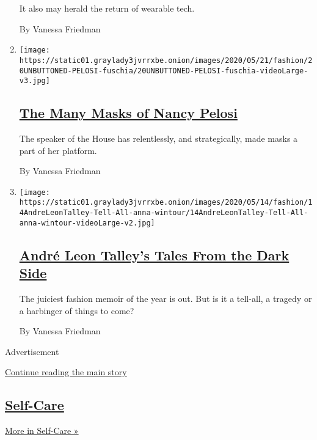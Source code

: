 \begin{enumerate}
  It also may herald the return of wearable tech.

  By Vanessa Friedman
\item
  \texttt{[image: https://static01.graylady3jvrrxbe.onion/images/2020/05/21/fashion/20UNBUTTONED-PELOSI-fuschia/20UNBUTTONED-PELOSI-fuschia-videoLarge-v3.jpg]}

  \hypertarget{the-many-masks-of-nancy-pelosi}{%
  \subsection{\texorpdfstring{\href{/2020/05/20/fashion/nancy-pelosi-face-masks.html}{The
  Many Masks of Nancy
  Pelosi}}{The Many Masks of Nancy Pelosi}}\label{the-many-masks-of-nancy-pelosi}}

  The speaker of the House has relentlessly, and strategically, made
  masks a part of her platform.

  By Vanessa Friedman
\item
  \texttt{[image: https://static01.graylady3jvrrxbe.onion/images/2020/05/14/fashion/14AndreLeonTalley-Tell-All-anna-wintour/14AndreLeonTalley-Tell-All-anna-wintour-videoLarge-v2.jpg]}

  \hypertarget{andruxe9-leon-talleys-tales-from-the-dark-side}{%
  \subsection{\texorpdfstring{\href{/2020/05/14/style/andre-leon-talley-anna-wintour-tell-all.html}{André
  Leon Talley's Tales From the Dark
  Side}}{André Leon Talley's Tales From the Dark Side}}\label{andruxe9-leon-talleys-tales-from-the-dark-side}}

  The juiciest fashion memoir of the year is out. But is it a tell-all,
  a tragedy or a harbinger of things to come?

  By Vanessa Friedman
\end{enumerate}

Advertisement

\protect\hyperlink{after-mid2}{Continue reading the main story}

\hypertarget{self-care}{%
\subsection{\texorpdfstring{\href{/section/style/self-care}{Self-Care}}{Self-Care}}\label{self-care}}

\href{/section/style/self-care}{More in Self-Care »}

